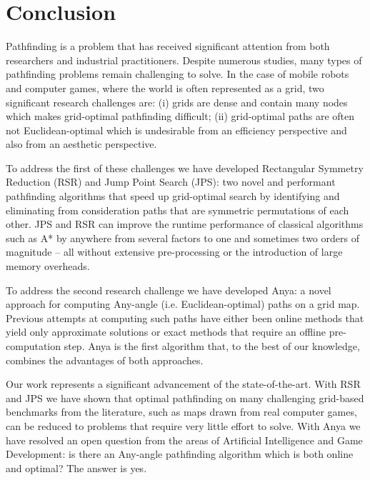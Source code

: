 \chapter{Conclusion}
\label{cha::conclusion}

Pathfinding is a problem that has received significant attention from both
researchers and industrial practitioners. Despite numerous studies, many types
of pathfinding problems remain challenging to solve. In the case of
mobile robots and computer games, where the world is often represented as a
grid, two significant research challenges are: (i) grids are dense and
contain many nodes which makes grid-optimal pathfinding difficult; (ii)
grid-optimal paths are often not Euclidean-optimal which is undesirable from
an efficiency perspective and also from an aesthetic perspective.

To address the first of these challenges we have developed Rectangular
Symmetry Reduction (RSR) and Jump Point Search (JPS): two novel and performant
pathfinding algorithms that speed up grid-optimal search by identifying and
eliminating from consideration paths that are symmetric permutations of each
other.  JPS and RSR can improve the runtime performance of classical
algorithms such as A{*} by anywhere from several factors to one and sometimes
two orders of magnitude -- all without extensive pre-processing or the
introduction of large memory overheads.

To address the second research challenge we have developed Anya: a novel
approach for computing Any-angle (i.e. Euclidean-optimal) paths on a grid map.
Previous attempts at computing such paths have either been online methods that
yield only approximate solutions or exact methods that require an offline
pre-computation step.  Anya is the first algorithm that, to the best of our
knowledge, combines the advantages of both approaches.

Our work represents a significant advancement of the state-of-the-art. With
RSR and JPS we have shown that optimal pathfinding on many challenging
grid-based benchmarks from the literature, such as maps drawn from real
computer games, can be reduced to problems that require very little effort to
solve. With Anya we have resolved an open question from the areas of
Artificial Intelligence and Game Development: is there an Any-angle
pathfinding algorithm which is both online and optimal?  The answer is yes.

\newpage
